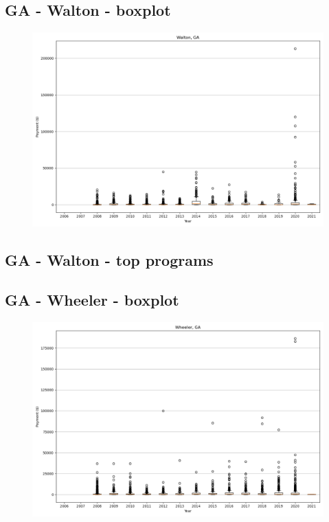 \subsection*{GA - Walton - boxplot}
\begin{figure}[h]
\centering
\includegraphics[width=7in]{../output/boxplots/counties/Walton-GA_boxplot.png}
\end{figure}


\subsection*{GA - Walton - top programs}

\newpage
\subsection*{GA - Wheeler - boxplot}
\begin{figure}[h]
\centering
\includegraphics[width=7in]{../output/boxplots/counties/Wheeler-GA_boxplot.png}
\end{figure}


